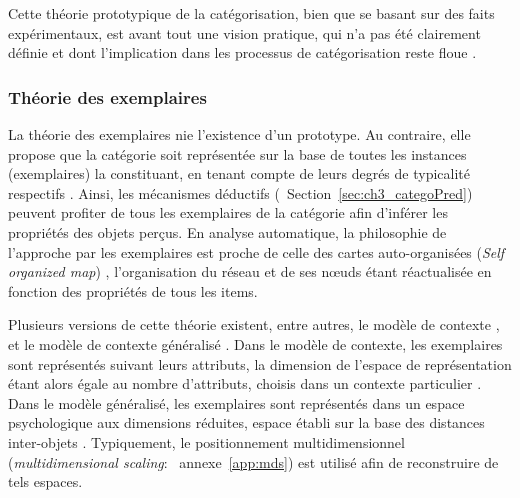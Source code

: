 Cette théorie prototypique de la catégorisation, bien que se basant sur des faits expérimentaux, est avant tout une vision pratique, qui n'a pas été clairement définie et dont l'implication dans les processus de catégorisation reste floue \citep[p. 36-40]{rosch1978cognition} \citep[p. 49-54]{dubois1991semantique}.

\subsubsection{Théorie des exemplaires}

La théorie des exemplaires nie l'existence d'un prototype. Au contraire, elle propose que la catégorie soit représentée sur la base de toutes les instances (exemplaires) la constituant, en tenant compte de leurs degrés de typicalité respectifs \citep{medin1978context,nosofsky1986attention,nosofsky1992similarity}. Ainsi, les mécanismes déductifs (\cf~Section~\ref{sec:ch3_categoPred}) peuvent profiter de tous les exemplaires de la catégorie afin d'inférer les propriétés des objets perçus. En analyse automatique, la philosophie de l'approche par les exemplaires est proche de celle des cartes auto-organisées (\emph{Self organized map}) \citep{kohonen1995som}, l’organisation du réseau et de ses nœuds étant réactualisée en fonction des propriétés de tous les items.

Plusieurs versions de cette théorie existent, entre autres, le modèle de contexte \citep{medin1978context}, et le modèle de contexte généralisé \citep{nosofsky1986attention}. Dans le modèle de contexte, les exemplaires sont représentés suivant leurs attributs, la dimension de l'espace de représentation étant alors égale au nombre d'attributs, choisis dans un contexte particulier \citep{hitzman1986schema}. Dans le modèle généralisé, les exemplaires sont représentés dans un espace psychologique aux dimensions réduites, espace établi sur la base des distances inter-objets \citep{nosofsky1992similarity}. Typiquement, le positionnement multidimensionnel (\emph{multidimensional scaling}: \cf~annexe~\ref{app:mds}) est utilisé afin de reconstruire de tels espaces.


